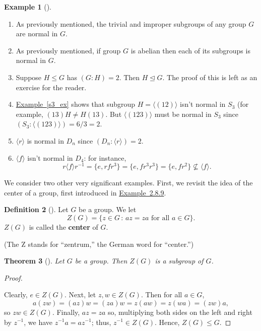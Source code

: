 \documentclass[10pt,]{book}
\newcommand{\terminology}[1]{\textbf{#1}}
\theoremstyle{plain}
\newtheorem{theorem}{Theorem}[section]
\theoremstyle{definition}
\newtheorem{definition}[theorem]{Definition}
\theoremstyle{definition}
\theoremstyle{definition}
\newtheorem{example}[theorem]{Example}
\theoremstyle{definition}
\numberwithin{equation}{section}
\begin{document}
\begin{example}[]\label{example-78}
\leavevmode%
\begin{enumerate}
\item\hypertarget{li-491}{}As previously mentioned, the trivial and improper subgroups of any group \(G\) are normal in \(G\).%
\item\hypertarget{li-492}{}As previously mentioned, if group \(G\) is abelian then each of its subgroups is normal in \(G\).%
\item\hypertarget{li-493}{}Suppose \(H\leq G\) has \((G:H)=2\).  Then \(H \unlhd G\). The proof of this is left as an exercise for the reader.%
\item\hypertarget{li-494}{}\hyperref[s3_ex]{Example~\ref{s3_ex}} shows that subgroup \(H=\langle (12)\rangle\) isn't normal in \(S_3\) (for example, \((13)H\neq H(13)\).  But \(\langle (123)\rangle\) must be normal in \(S_3\) since \((S_3:\langle (123)\rangle )=6/3=2.\)%
\item\hypertarget{li-495}{}\(\langle r\rangle\) is normal in \(D_n\) since \((D_n:\langle r\rangle )=2\).%
\item\hypertarget{li-496}{}\(\langle f\rangle\) isn't normal in \(D_4\): for instance,%
\begin{equation*}
r\langle f\rangle r^{-1}=\{e,rfr^3\}=\{e, fr^3r^3\}=\{e,fr^2\}\not\subseteq
\langle f\rangle .
\end{equation*}
%
\end{enumerate}
\end{example}
We consider two other very significant examples. First, we revisit the idea of the center of a group, first introduced in \hyperlink{zgdef}{Example~2.8.9}.%
\begin{definition}[{}]\label{definition-67}
Let \(G\) be a group. We let%
\begin{equation*}
Z(G)=\{z\in G\,:\, az=za \text{ for all } a\in
G\}.
\end{equation*}
\(Z(G)\) is called the \terminology{center} of \(G\).%
\par
(The Z stands for ``zentrum,'' the German word for ``center.'')%
\end{definition}
\begin{theorem}[{}]\label{theorem-51}
Let \(G\) be a group. Then \(Z(G)\) is a subgroup of \(G\).%
\end{theorem}
\begin{proof}\hypertarget{proof-43}{}
Clearly, \(e\in Z(G)\). Next, let \(z,w\in Z(G)\). Then for all \(a \in G\),%
\begin{equation*}
a(zw)=(az)w=(za)w=z(aw)=z(wa)=(zw)a,
\end{equation*}
so \(zw\in Z(G)\). Finally, \(az=za\) so, multiplying both sides on the left and right by \(z^{-1}\), we have \(z^{-1}a=az^{-1}\); thus, \(z^{-1}\in Z(G)\). Hence, \(Z(G)\leq G\).%
\end{proof}
\end{document}
